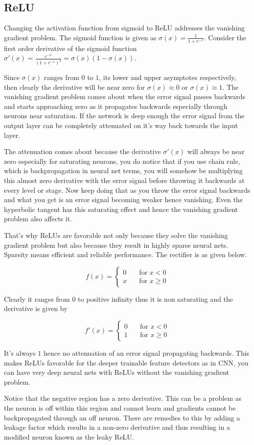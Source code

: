\documentclass{article}
\begin{document}
\subsection{ReLU}
Changing the activation function from sigmoid to ReLU addresses the vanishing gradient problem.
The sigmoid function is given as $\sigma(x) = \frac{1}{1 + e^{-x}}$.  Consider the first order derivative of the sigmoid function $\sigma'(x) = \frac{e^{-x}}{(1 + e^{-x})^2} = \sigma(x)(1-\sigma(x))$.

Since  $\sigma(x)$  ranges from $0$ to $1$, its lower and upper asymptotes respectively, then clearly the derivative will be near zero for $\sigma(x) \approx 0$ or $\sigma(x) \approx 1$. The vanishing gradient problem comes about when the error signal passes backwards and starts approaching zero as it propagates backwards especially through neurons near saturation. If the network is deep enough the error signal from the output layer can be completely attenuated on it's way back towards the input layer.

The attenuation comes about because the derivative $\sigma'(x)$ will always be near zero especially for saturating neurons, you do notice that if you use chain rule, which is backpropagation in neural net terms, you will somehow be multiplying this almost zero derivative with the error signal before throwing it backwards at every level or stage. Now keep doing that as you throw the error signal backwards and what you get is an error signal becoming weaker hence vanishing. Even the hyperbolic tangent has this saturating effect and hence the vanishing gradient problem also affects it.

That's why ReLUs are favorable not only because they solve the vanishing gradient problem but also because they result in highly sparse neural nets. Sparsity means efficient and reliable performance. The rectifier is as given below.

\[ f(x) = 
\begin{cases}
    0  & \quad \text{for } x < 0\\
    x  & \quad \text{for } x \geq 0
  \end{cases}
\]

Clearly it ranges from 0 to positive infinity thus it is non saturating and the derivative is given by

\[ f'(x) = 
\begin{cases}
    0  & \quad \text{for } x < 0\\
    1  & \quad \text{for } x \geq 0
  \end{cases}
\]


It's always $1$ hence no attenuation of an error signal propagating backwards. This makes ReLUs favorable for the deeper trainable feature detectors as in CNN, you can have very deep neural nets with ReLUs without the vanishing gradient problem.

Notice that the negative region has a zero derivative. This can be a problem as the neuron is off within this region and cannot learn and gradients cannot be backpropagated through an off neuron. There are remedies to this by adding a leakage factor which results in a non-zero derivative and thus resulting in a modified neuron known as the leaky ReLU.
\end{document}
